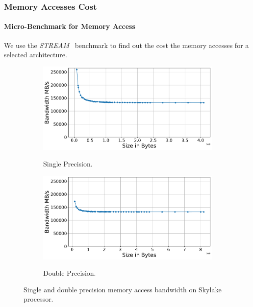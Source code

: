 \documentclass[sigconf,review,anonymous]{acmart}
\begin{document}
\subsubsection{Memory Accesses Cost}

\paragraph{Micro-Benchmark for Memory Access}
We use the \textit{STREAM}~\cite{mccalpin1995stream} benchmark to find
out the cost the memory accesses for a selected architecture.

\begin{figure}[hbt!]
  \centering
  \begin{subfigure}[b]{.48\linewidth}
    \includegraphics[width=\linewidth]{figures/stream/skylake_mpi_copy_single_precision.pdf}
    \label{fig:stream-single-copy}
    \caption{Single Precision.}
  \end{subfigure}
  \begin{subfigure}[b]{.48\linewidth}
    \includegraphics[width=\linewidth]{figures/stream/skylake_mpi_copy_double_precision.pdf}
    \label{fig:stream-double-copy}
    \caption{Double Precision.}
  \end{subfigure}
    
  \caption{Single and double precision memory access bandwidth on Skylake processor.}
  \label{fig:stream-copy-bandwidth}
\end{figure}
\end{document}
